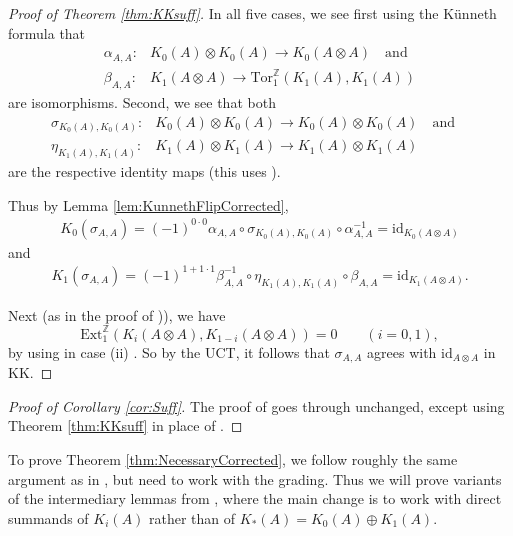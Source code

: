 \documentclass[a4paper,10pt]{amsart}
\numberwithin{equation}{section}
\numberwithin{theorem}{section}
\newcommand{\Z}{\mathbb{Z}}
\newcommand{\Tor}{\mathrm{Tor}_1^{\Z}}
\newcommand{\id}{\mathrm{id}}
\newcommand{\AS}[1]{}
\begin{document}
\begin{proof}[{Proof of Theorem \ref{thm:KKsuff}}]
In all five cases, we see first using the K\"unneth formula that
	\begin{align*} 	
		\alpha_{A,A} \colon &K_0(A)\otimes K_0(A) \to K_0(A\otimes A) \quad \text{and} \\
			 \beta_{A,A} \colon & K_1(A\otimes A) \to \Tor(K_1(A),K_1(A)) 
		\end{align*}
are isomorphisms.
Second, we see that both
	\begin{align*}
		\sigma_{K_0(A),K_0(A)} \colon &K_0(A)\otimes K_0(A) \to K_0(A)\otimes K_0(A)
\quad \text{and}\quad  \\
\eta_{K_1(A),K_1(A)}  \colon &K_1(A)\otimes K_1(A) \to K_1(A)\otimes K_1(A)
\end{align*}
are the respective identity maps (this uses \cite[Proposition 5.1]{aifK}).

Thus by Lemma \ref{lem:KunnethFlipCorrected},
\begin{align*}
K_0(\sigma_{A,A}) = (-1)^{0\cdot 0}\alpha_{A,A}\circ \sigma_{K_0(A),K_0(A)}\circ \alpha_{A,A}^{-1} = \id_{K_0(A\otimes A)}
\end{align*}
and
\begin{align*}
K_1(\sigma_{A,A}) = (-1)^{1+1\cdot 1}\beta_{A,A}^{-1}\circ \eta_{K_1(A),K_1(A)}\circ \beta_{A,A} = \id_{K_1(A\otimes A)}.
\end{align*}

Next (as in the proof of \cite[Theorem 5.2]{aifK})), we have 
$$
	\mathrm{Ext}_1^{\Z}(K_i(A\otimes A),K_{1-i}(A\otimes A))=0 \qquad (i=0,1),
$$ by using \cite[Lemma 1.1]{aifK} in case (ii) \AS{This was case (v) before}. So by the UCT, it follows that $\sigma_{A,A}$ agrees with $\id_{A\otimes A}$ in KK.
\end{proof}

\begin{proof}[{Proof of Corollary \ref{cor:Suff}}]
The proof of \cite[Corollary 5.3]{aifK} goes through unchanged, except using Theorem \ref{thm:KKsuff} in place of \cite[Theorem 5.2]{aifK}.
\end{proof}

To prove Theorem \ref{thm:NecessaryCorrected}, we follow roughly the same argument as in \cite[Section 6]{aifK}, but need to work with the grading.
Thus we will prove variants of the intermediary lemmas from \cite[Section 6]{aifK}, where the main change is to work with direct summands of $K_i(A)$ rather than of $K_*(A)=K_0(A)\oplus K_1(A)$.
\end{document}
